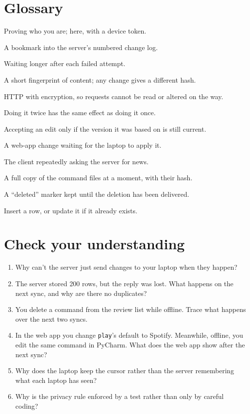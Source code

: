\documentclass[11pt,a4paper]{article}
\begin{document}
\section{Glossary}
\begin{description}[style=nextline,leftmargin=1.2cm,itemsep=2pt]
  \item[Authentication] Proving who you are; here, with a device token.
  \item[Cursor] A bookmark into the server's numbered change log.
  \item[Exponential back-off] Waiting longer after each failed attempt.
  \item[Hash] A short fingerprint of content; any change gives a different hash.
  \item[HTTPS] HTTP with encryption, so requests cannot be read or altered on the way.
  \item[Idempotent] Doing it twice has the same effect as doing it once.
  \item[Optimistic concurrency] Accepting an edit only if the version it was based on is still current.
  \item[Pending edit] A web-app change waiting for the laptop to apply it.
  \item[Polling] The client repeatedly asking the server for news.
  \item[Snapshot] A full copy of the command files at a moment, with their hash.
  \item[Tombstone] A ``deleted'' marker kept until the deletion has been delivered.
  \item[Upsert] Insert a row, or update it if it already exists.
\end{description}

\section{Check your understanding}
\begin{exercise}
\begin{enumerate}
  \item Why can't the server just send changes to your laptop when they happen?
  \item The server stored 200 rows, but the reply was lost. What happens on the next sync, and
        why are there no duplicates?
  \item You delete a command from the review list while offline. Trace what happens over the
        next two syncs.
  \item In the web app you change \texttt{play}'s default to Spotify. Meanwhile, offline, you
        edit the same command in PyCharm. What does the web app show after the next sync?
  \item Why does the laptop keep the cursor rather than the server remembering what each laptop
        has seen?
  \item Why is the privacy rule enforced by a test rather than only by careful coding?
\end{enumerate}
\end{exercise}
\end{document}
